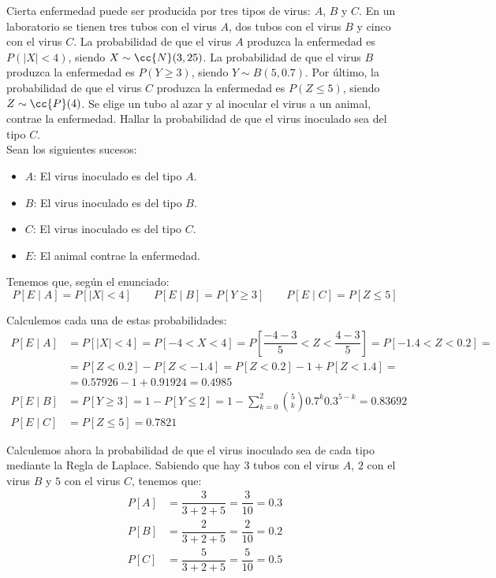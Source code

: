 \begin{ejercicio}
    Cierta enfermedad puede ser producida por tres tipos de virus: $A$, $B$ y $C$. En un laboratorio se tienen tres tubos con el virus $A$, dos tubos con el virus $B$ y cinco con el virus $C$. La probabilidad de que el virus $A$ produzca la enfermedad es $P(|X| < 4)$, siendo $X \sim \cc{N}(3,25)$. La probabilidad de que el virus $B$ produzca la enfermedad es $P(Y \geq 3)$, siendo $Y \sim B(5,0.7)$. Por último, la probabilidad de que el virus $C$ produzca la enfermedad es $P(Z \leq 5)$, siendo $Z \sim \cc{P}(4)$. Se elige un tubo al azar y al inocular el virus a un animal, contrae la enfermedad. Hallar la probabilidad de que el virus inoculado sea del tipo $C$.\\

    Sean los siguientes sucesos:
    \begin{itemize}
        \item $A$: El virus inoculado es del tipo $A$.
        \item $B$: El virus inoculado es del tipo $B$.
        \item $C$: El virus inoculado es del tipo $C$.
        \item $E$: El animal contrae la enfermedad.
    \end{itemize}

    Tenemos que, según el enunciado:
    \begin{equation*}
        P[E\mid A] = P[|X|<4] \qquad
        P[E\mid B] = P[Y\geq 3] \qquad
        P[E\mid C] = P[Z\leq 5]
    \end{equation*}

    Calculemos cada una de estas probabilidades:
    \begin{align*}
        P[E\mid A] &= P[|X|<4] = P[-4<X<4] = P\left[\dfrac{-4-3}{5}<Z<\dfrac{4-3}{5}\right] = P[-1.4<Z<0.2] =\\&= P[Z<0.2] - P[Z<-1.4] = P[Z<0.2] - 1 + P[Z<1.4] =\\&= 0.57926 - 1 + 0.91924 = 0.4985 \\
        P[E\mid B] &= P[Y\geq 3] = 1-P[Y\leq 2]
        = 1-\sum_{k=0}^{2} \binom{5}{k} 0.7^k 0.3^{5-k} = 0.83692\\
        P[E\mid C] &= P[Z\leq 5] = 0.7821
    \end{align*}

    Calculemos ahora la probabilidad de que el virus inoculado sea de cada tipo mediante la Regla de Laplace. Sabiendo que hay $3$ tubos con el virus $A$, $2$ con el virus $B$ y $5$ con el virus $C$, tenemos que:
    \begin{align*}
        P[A] &= \dfrac{3}{3+2+5} = \dfrac{3}{10} = 0.3\\
        P[B] &= \dfrac{2}{3+2+5} = \dfrac{2}{10} = 0.2\\
        P[C] &= \dfrac{5}{3+2+5} = \dfrac{5}{10} = 0.5
    \end{align*}


\end{ejercicio}
